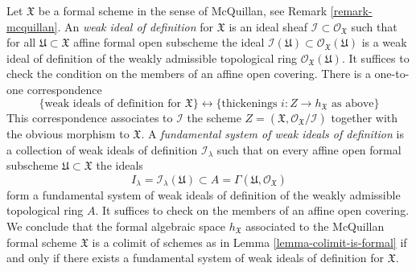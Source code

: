 \begin{remark}
\label{remark-weak-ideals-of-definition}
Let $\mathfrak X$ be a formal scheme in the sense of McQuillan, see
Remark \ref{remark-mcquillan}. An {\it weak ideal of definition}
for $\mathfrak X$ is an ideal sheaf
$\mathcal{I} \subset \mathcal{O}_\mathfrak X$ such that
for all $\mathfrak U \subset \mathfrak X$ affine formal open subscheme
the ideal
$\mathcal{I}(\mathfrak U) \subset \mathcal{O}_\mathfrak X(\mathfrak U)$
is a weak ideal of definition of the weakly admissible topological ring
$\mathcal{O}_\mathfrak X(\mathfrak U)$.
It suffices to check the condition on the members of an affine open covering.
There is a one-to-one correspondence
$$
\{\text{weak ideals of definition for }\mathfrak X\}
\leftrightarrow
\{\text{thickenings }i : Z \to h_\mathfrak X\text{ as above}\}
$$
This correspondence associates to $\mathcal{I}$ the scheme
$Z = (\mathfrak X, \mathcal{O}_\mathfrak X/\mathcal{I})$
together with the obvious morphism to $\mathfrak X$.
A {\it fundamental system of weak ideals of definition}
is a collection of weak ideals of definition
$\mathcal{I}_\lambda$ such that on every affine open
formal subscheme $\mathfrak U \subset \mathfrak X$ the
ideals
$$
I_\lambda = \mathcal{I}_\lambda(\mathfrak U) \subset
A = \Gamma(\mathfrak U, \mathcal{O}_\mathfrak X)
$$
form a fundamental system of weak ideals of definition of the
weakly admissible topological ring $A$. It suffices to check
on the members of an affine open covering. We conclude that
the formal algebraic space $h_\mathfrak X$ associated to
the McQuillan formal scheme $\mathfrak X$ is a colimit of schemes as
in Lemma \ref{lemma-colimit-is-formal} if and only if
there exists a fundamental system of weak ideals of definition
for $\mathfrak X$.
\end{remark}

